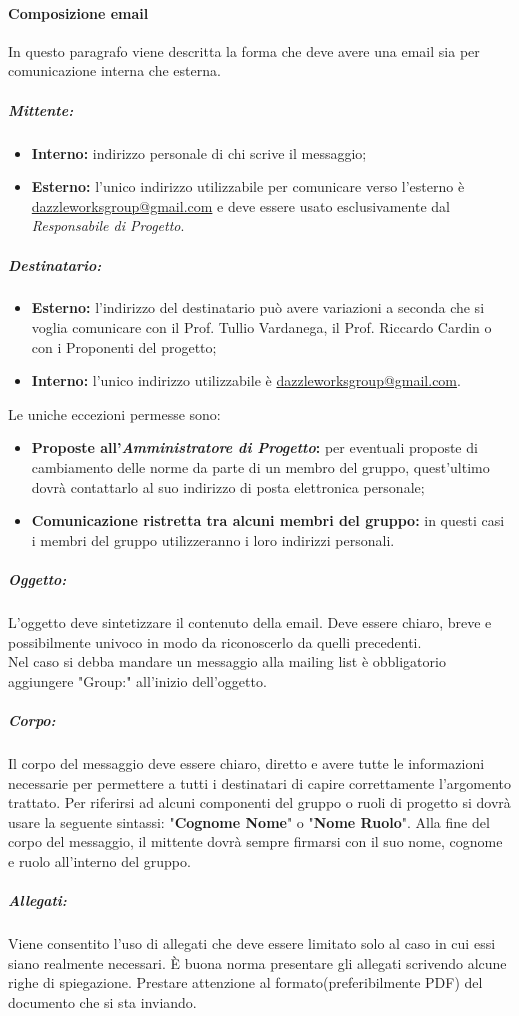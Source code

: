 		\paragraph{Composizione email}
			In questo paragrafo viene descritta la forma che deve avere una email sia per comunicazione interna che esterna.
			\subparagraph{Mittente:}
			\begin{itemize}
				\item \textbf{Interno:} indirizzo personale di chi scrive il messaggio;
				\item \textbf{Esterno:} l'unico indirizzo utilizzabile per comunicare verso l'esterno è \url{dazzleworksgroup@gmail.com} e deve essere usato esclusivamente dal \textit{Responsabile di Progetto}.
			\end{itemize}
			\subparagraph{Destinatario:}
			\begin{itemize}
				\item \textbf{Esterno:} l'indirizzo del destinatario può avere variazioni a seconda che si voglia comunicare con il Prof. Tullio Vardanega, il Prof. Riccardo Cardin o con i Proponenti del progetto;
				\item \textbf{Interno:} l'unico indirizzo utilizzabile è \url{dazzleworksgroup@gmail.com}.
			\end{itemize}
			Le uniche eccezioni permesse sono:
			\begin{itemize}
				\item \textbf{Proposte all'\textit{Amministratore di Progetto}:} per eventuali proposte di cambiamento delle norme da parte di un membro del gruppo, quest'ultimo dovrà contattarlo al suo indirizzo di posta elettronica personale;
				\item \textbf{Comunicazione ristretta tra alcuni membri del gruppo:} in questi casi i membri del gruppo utilizzeranno i loro indirizzi personali.
			\end{itemize}
			
			\subparagraph{Oggetto:}
			L'oggetto deve sintetizzare il contenuto della email. Deve essere chiaro, breve e possibilmente univoco in modo da riconoscerlo da quelli precedenti.\\
			Nel caso si debba mandare un messaggio alla mailing list è obbligatorio aggiungere "Group:" all'inizio dell'oggetto.
			\subparagraph{Corpo:}
			Il corpo del messaggio deve essere chiaro, diretto e avere tutte le informazioni necessarie per permettere a tutti i destinatari di capire correttamente l'argomento trattato. Per riferirsi ad alcuni componenti del gruppo o ruoli di progetto si dovrà usare la seguente sintassi: "\textbf{Cognome Nome}" o "\textbf{Nome Ruolo}". Alla fine del corpo del messaggio, il mittente dovrà sempre firmarsi con il suo nome, cognome e ruolo all'interno del gruppo.
			\subparagraph{Allegati:}
			Viene consentito l'uso di allegati che deve essere limitato solo al caso in cui essi siano realmente necessari. È buona norma presentare gli allegati scrivendo alcune righe di spiegazione. Prestare attenzione al formato(preferibilmente PDF) del documento che si sta inviando. 
			
